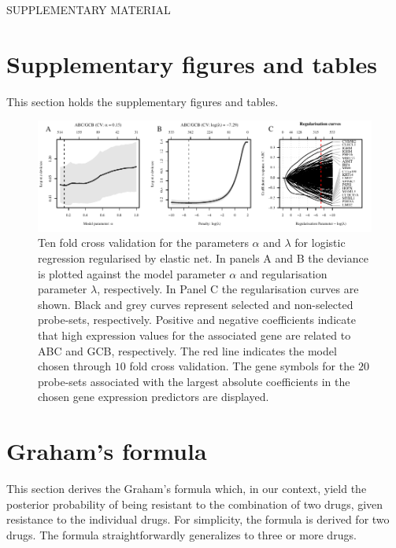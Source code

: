 % 
% 

{}
\begin{center}
{\huge SUPPLEMENTARY MATERIAL}\bigskip \\
{\bf \hemaClassTitle{}}
\end{center}

\section{Supplementary figures and tables}
This section holds the supplementary figures and tables.

\begin{figure}[htb]
\begin{center}
\includegraphics[width=1\textwidth]{figures/CrosvalidationClass.pdf}
\end{center}
\caption{Ten fold cross validation for the parameters $\alpha$ and $\lambda$ for logistic regression regularised by elastic net.
In panels A and B the deviance is plotted against the model parameter $\alpha$ and regularisation parameter $\lambda$, respectively.
In Panel C the regularisation curves are shown.
Black and grey curves represent selected and non-selected probe-sets, respectively.
Positive and negative coefficients indicate that high expression values for the associated gene are related to ABC and GCB, respectively.
The red line indicates the model chosen through $10$ fold cross validation.
The gene symbols for the $20$ probe-sets associated with the largest absolute coefficients in the chosen gene expression predictors are displayed.}
\label{fig:crossval}
\end{figure}





\clearpage



\section{Graham's formula}
\label{sec:graham}
This section derives the Graham's formula which, in our context, yield the posterior probability of being resistant to the combination of two drugs, given resistance to the individual drugs.
For simplicity, the formula is derived for two drugs.
The formula straightforwardly generalizes to three or more drugs.

